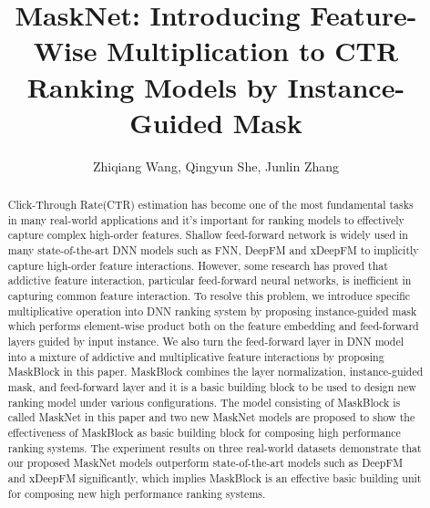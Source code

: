 \documentclass[sigconf]{acmart}
\begin{document}
\title{MaskNet: Introducing Feature-Wise Multiplication to CTR Ranking Models by Instance-Guided Mask}

\author{Zhiqiang Wang, Qingyun She, Junlin Zhang}



\begin{abstract}
Click-Through Rate(CTR) estimation has become one of the most fundamental tasks in many real-world applications and it’s important for ranking models to effectively capture complex high-order features. Shallow feed-forward network is widely used in many state-of-the-art DNN models such as FNN, DeepFM and xDeepFM to implicitly capture high-order feature interactions. However, some research has proved that  addictive feature interaction, particular feed-forward neural networks, is inefficient in capturing common feature interaction. To resolve this problem, we introduce specific multiplicative operation into DNN ranking system by proposing instance-guided mask which performs element-wise product both on the feature embedding and feed-forward layers guided by input instance. We also turn the feed-forward layer in DNN model into a mixture of addictive and multiplicative feature interactions by proposing MaskBlock in this paper. MaskBlock combines the layer normalization, instance-guided mask, and feed-forward layer and it is a basic building block to be used to design new ranking model under various configurations. The model consisting of MaskBlock is called MaskNet in this paper and two new MaskNet models are proposed to show the effectiveness of MaskBlock as basic building block for composing high performance ranking systems.  The experiment results on three real-world datasets demonstrate that our proposed MaskNet models outperform state-of-the-art models such as DeepFM and xDeepFM significantly, which implies MaskBlock is an effective basic building unit for composing new high performance ranking systems.

\end{abstract}







\maketitle
\end{document}
